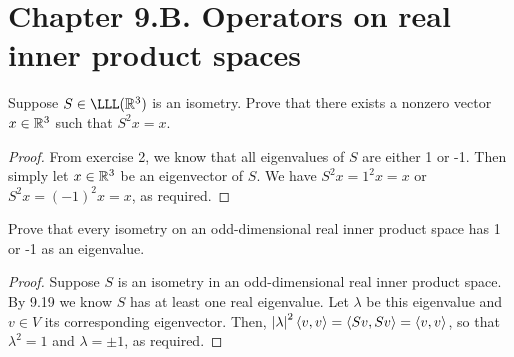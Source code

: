 \section*{Chapter 9.B. Operators on real inner product spaces}


\begin{exercise}{1}
  Suppose $S\in\LLL(\R^3)$ is an isometry. Prove that there exists a nonzero vector $x\in\mathbb{R}^3$ such that $S^2x=x$.
\end{exercise}
\begin{proof}
 From exercise 2, we know that all eigenvalues of $S$ are either 1 or -1. Then simply let $x\in\mathbb{R}^3$ be an eigenvector of $S$. We have $S^2x=1^2x=x$ or $S^2x=(-1)^2x=x$, as required.
\end{proof}

\begin{exercise}{2}
  Prove that every isometry on an odd-dimensional real inner product space has 1 or -1 as an eigenvalue.
\end{exercise}
\begin{proof}
 Suppose $S$ is an isometry in an odd-dimensional real inner product space. By 9.19 we know $S$ has at least one real eigenvalue. Let $\lambda$ be this eigenvalue and $v\in V$ its corresponding eigenvector. Then, $\left\lvert \lambda\right\rvert^2\langle v,v\rangle=\langle Sv,Sv\rangle=\langle v,v\rangle$, so that $\lambda^2=1$ and $\lambda=\pm 1$, as required.
\end{proof}

